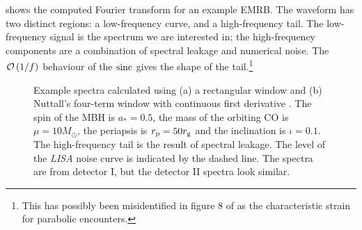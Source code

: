  shows the computed Fourier transform for an example EMRB. The waveform has two distinct regions: a low-frequency curve, and a high-frequency tail. The low-frequency signal is the spectrum we are interested in; the high-frequency components are a combination of spectral leakage and numerical noise. The $\mathcal{O}\left({1/{f}}\right)$ behaviour of the $\operatorname{sinc}$ gives the shape of the tail.\footnote{This has possibly been misidentified in figure 8 of \citet{Burko2007} as the characteristic strain for parabolic encounters.}
\begin{figure}%
  \centering
    \quad
    \caption{Example spectra calculated using (a) a rectangular window and (b) Nuttall's four-term window with continuous first derivative \citep{Nuttall1981}. The spin of the MBH is $a_\ast = 0.5$, the mass of the orbiting CO is $\mu = 10 M_\odot$, the periapsis is $r_\mathrm{p} = 50 r_\mathrm{g}$ and the inclination is $\iota = 0.1$. The high-frequency tail is the result of spectral leakage. The level of the \textit{LISA} noise curve is indicated by the dashed line. The spectra are from detector I, but the detector II spectra look similar.}
  \label{fig:Windowing}
\end{figure}


